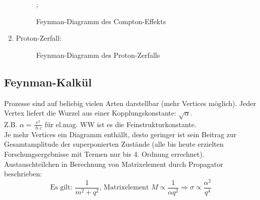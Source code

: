 \documentclass[Ex4_Zusammenfassung.tex]{subfiles}
\begin{document}
\begin{enumerate}
\begin{figure}[H]
\begin{tikzpicture}
					\end{tikzpicture}
					;
					\caption{Feynman-Diagramm des Compton-Effekts}
				\end{figure}
			\newpage
			\item Proton-Zerfall:
				\begin{figure}[H]
					\centering
					\caption{Feynman-Diagramm des Proton-Zerfalls}
				\end{figure}
	\end{enumerate}
	
	\subsection*{Feynman-Kalkül}
	
	Prozesse sind auf beliebig vielen Arten darstellbar (mehr Vertices möglich). Jeder Vertex liefert die Wurzel aus einer Kopplungskonstante: $\sqrt{\alpha}$.\\
	Z.B. $\alpha = \frac{e^2}{\hslash c}$ für el.mag. WW ist es die Feinstrukturkonstante.\\
	Je mehr Vertices ein Diagramm enthällt, desto geringer ist sein Beitrag zur Gesamtamplitude der superponierten Zustände (alle bis heute erzielten Forschungsergebnisse mit Termen nur bis 4. Ordnung errechnet).\\
	Austauschteilchen in Berechnung von Matrixelement durch Propagator beschrieben:
	$$ \text{Es gilt: } \frac{1}{m^2 + q^2} \text{, Matrixelement } M \propto \frac{1}{\alpha q^2} \Rightarrow \sigma \propto \frac{\alpha^2}{q^4}$$
		
	
\end{document}
